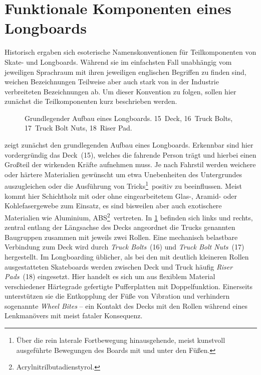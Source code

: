 	\section{Funktionale Komponenten eines Longboards}
		Historisch ergaben sich esoterische Namenskonventionen für Teilkomponenten von Skate- und Longboards.
		Während sie im einfachsten Fall unabhängig vom jeweiligen Sprachraum mit ihren jeweiligen englischen Begriffen zu finden sind, weichen Bezeichnungen Teilweise aber auch stark von in der Industrie verbreiteten Bezeichnungen ab.
		Um dieser Konvention zu folgen, sollen hier zunächst die Teilkomponenten kurz beschrieben werden.\par\medskip
		\begin{figure}[h]
			\centering
			
			\caption[Grundlegender Aufbau eines Longboards]{Grundlegender Aufbau eines Longboards. 15~Deck, 16~Truck Bolts, 17~Truck Bolt Nuts, 18~Riser Pad.}\label{fig:longboard}
		\end{figure}
		 zeigt zunächst den grundlegenden Aufbau eines Longboards.
		Erkennbar sind hier vordergründig das Deck~(15), welches die fahrende Person trägt und hierbei einen Großteil der wirkenden Kräfte aufnehmen muss.
		Je nach Fahrstil werden weichere oder härtere Materialien gewünscht um etwa Unebenheiten des Untergrundes auszugleichen oder die Ausführung von Tricks\footnote{Über die rein laterale Fortbewegung hinausgehende, meist kunstvoll ausgeführte Bewegungen des Boards mit und unter den Füßen.}~positiv zu beeinflussen.\linebreak
		Meist kommt hier Schichtholz mit oder ohne eingearbeitetem Glas-, Aramid- oder Kohlefasergewebe zum Einsatz, es sind bisweilen aber auch exotischere Materialien wie Aluminium, ABS\footnote{Acrylnitrilbutadienstyrol.}~vertreten.
		In \cref{fig:longboard} befinden sich links und rechts, zentral entlang der Längsachse des Decks angeordnet die Trucks genannten Baugruppen zusammen mit jeweils zwei Rollen.
		Eine mechanisch belastbare Verbindung zum Deck wird durch \textit{Truck Bolts}~(16) und \textit{Truck Bolt Nuts}~(17) hergestellt.
		Im Longboarding üblicher, als bei den mit deutlich kleineren Rollen ausgestatteten Skateboards werden zwischen Deck und Truck häufig \textit{Riser Pads}~(18) eingesetzt.
		Hier handelt es sich um aus flexiblem Material verschiedener Härtegrade gefertigte Pufferplatten mit Doppelfunktion.
		Einerseits unterstützen sie die Entkopplung der Füße von Vibration und verhindern sogenannte \textit{Wheel Bites} -- ein Kontakt des Decks mit den Rollen während eines Lenkmanövers mit meist fataler Konsequenz.\par
